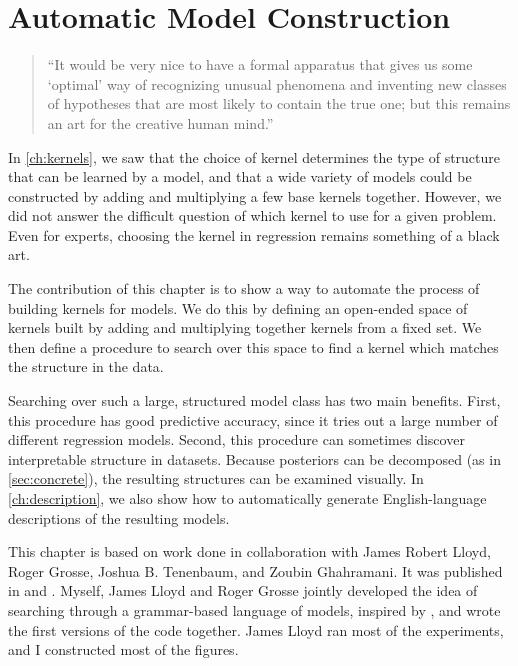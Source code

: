 
\inbpdocument


\chapter{Automatic Model Construction}
\label{ch:grammar}

\begin{quotation}
``It would be very nice to have a formal apparatus that gives us some `optimal' way of recognizing unusual phenomena and inventing new classes of hypotheses that are most likely to contain the true one; but this remains an art for the creative human mind.''

\hspace*{\fill}
\end{quotation}


In \cref{ch:kernels}, we saw that the choice of kernel determines the type of structure that can be learned by a \gp{} model, and that a wide variety of models could be constructed by adding and multiplying a few base kernels together.
However, we did not answer the difficult question of which kernel to use for a given problem.
Even for experts, choosing the kernel in \gp{} regression remains something of a black art.

The contribution of this chapter is to show a way to automate the process of building kernels for \gp{} models.
We do this by defining an open-ended space of kernels built by adding and multiplying together kernels from a fixed set.
We then define a procedure to search over this space to find a kernel which matches the structure in the data.

Searching over such a large, structured model class has two main benefits.
First, this procedure has good predictive accuracy, since it tries out a large number of different regression models.
Second, this procedure can sometimes discover interpretable structure in datasets.
Because \gp{} posteriors can be decomposed (as in \cref{sec:concrete}), the resulting structures can be examined visually.
In \cref{ch:description}, we also show how to automatically generate English-language descriptions of the resulting models.


This chapter is based on work done in collaboration with James Robert Lloyd, Roger Grosse, Joshua B. Tenenbaum, and Zoubin Ghahramani.
It was published in \citet{DuvLloGroetal13} and \citet{LloDuvGroetal14}.
Myself, James Lloyd and Roger Grosse jointly developed the idea of searching through a grammar-based language of \gp{} models, inspired by \citet{grosse2012exploiting}, 
and wrote the first versions of the code together.
James Lloyd ran most of the experiments, and I constructed most of the figures.

